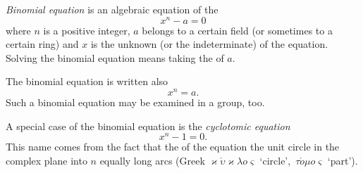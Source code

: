 \documentclass[12pt]{article}
\theoremstyle{definition}
\begin{document}
{\em Binomial equation} is an algebraic equation of the 
$$x^n-a = 0$$
where $n$ is a positive integer,  $a$ belongs to a certain field (or sometimes to a certain ring) and $x$ is the unknown (or the indeterminate) of the equation.\, Solving the binomial equation means taking the  of $a$.

The binomial equation is written also
$$x^n = a.$$
Such a binomial equation may be examined in a group, too.

A special case of the binomial equation is the {\em cyclotomic equation}
$$x^n-1 = 0.$$
This name comes from the fact that the  of the equation  the unit circle in the complex plane into $n$ equally long arcs (Greek  $\varkappa\acute{\upsilon}\varkappa\lambda{o}\varsigma$ `circle', \,$\tau\acute{o}\mu{o}\varsigma$ `part').
\end{document}
